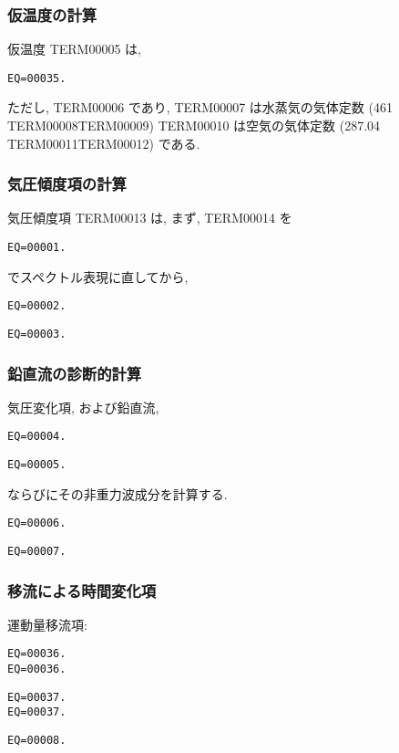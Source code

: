 \subsubsection{仮温度の計算}

仮温度 TERM00005 は, 
\begin{verbatim}
EQ=00035.
\end{verbatim}
ただし, TERM00006 であり, 
TERM00007 は水蒸気の気体定数
(461 TERM00008TERM00009)
TERM00010 は空気の気体定数
(287.04 TERM00011TERM00012)
である.

\subsubsection{気圧傾度項の計算}

気圧傾度項 TERM00013 は,
まず, TERM00014 を
\begin{verbatim}
EQ=00001.
\end{verbatim}
でスペクトル表現に直してから,
\begin{verbatim}
EQ=00002.
\end{verbatim}
\begin{verbatim}
EQ=00003.
\end{verbatim}

\subsubsection{鉛直流の診断的計算}

気圧変化項, および鉛直流,
\begin{verbatim}
EQ=00004.
\end{verbatim}
%
\begin{verbatim}
EQ=00005.
\end{verbatim}
%
ならびにその非重力波成分を計算する.
%
\begin{verbatim}
EQ=00006.
\end{verbatim}
%
\begin{verbatim}
EQ=00007.
\end{verbatim}

\subsubsection{移流による時間変化項}

運動量移流項:
\begin{verbatim}
EQ=00036.
EQ=00036.
\end{verbatim}
%
\begin{verbatim}
EQ=00037.
EQ=00037.
\end{verbatim}
\begin{verbatim}
EQ=00008.
\end{verbatim}

